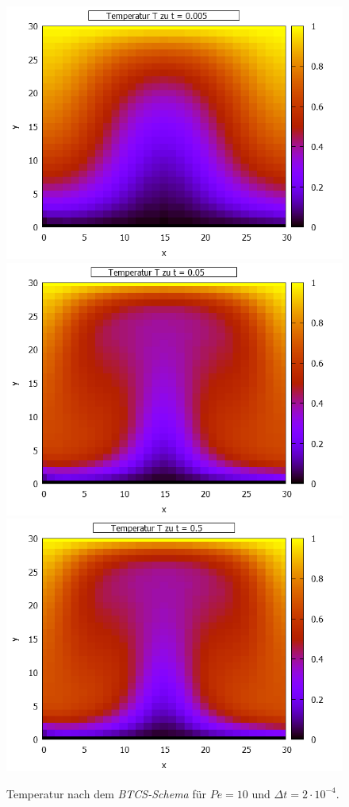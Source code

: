 \documentclass[12pt,a4paper,titlepage,headinclude,bibtotoc]{scrartcl}
\begin{document}
\noindent\begin{minipage}[t]{0.56\textwidth}%
\begin{figure}[H]  
   \includegraphics[width=\linewidth]{res/task6/grid0005.png}
   \includegraphics[width=\linewidth]{res/task6/grid005.png}
   \includegraphics[width=\linewidth]{res/task6/grid05.png}
   \caption{Temperatur nach dem \textit{BTCS-Schema} für $Pe=10$ und $\Delta t = 2\cdot10^{-4}$.}
   \label{fig:task6}
   \end{figure}
\end{minipage}%
\end{document}
